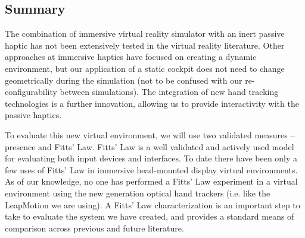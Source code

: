 %
%

\subsection{Summary}
\label{summary}

The combination of immersive virtual reality simulator with an inert passive haptic has not been extensively tested in the virtual reality literature.
Other approaches at immersive haptics have focused on creating a dynamic environment, but our application of a static cockpit does not need to change geometrically during the simulation (not to be confused with our re-configurability between simulations).
The integration of new hand tracking technologies is a further innovation, allowing us to provide interactivity with the passive haptics.

To evaluate this new virtual environment, we will use two validated measures -- presence and Fitts' Law.
Fitts' Law is a well validated and actively used model for evaluating both input devices and interfaces.
To date there have been only a few uses of Fitts' Law in immersive head-mounted display virtual environments.
As of our knowledge, no one has performed a Fitts' Law experiment in a virtual environment using the new generation optical hand trackers (i.e.
like the LeapMotion we are using).
A Fitts' Law characterization is an important step to take to evaluate the system we have created, and provides a standard means of comparison across previous and future literature.

